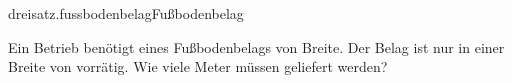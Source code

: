 \begin{exercise}{dreisatz.fussbodenbelag}{Fußbodenbelag}
  \ifproblem\problem\par
    Ein Betrieb benötigt  eines Fußbodenbelags von  Breite.
    Der Belag ist nur in einer Breite von  vorrätig. Wie viele Meter
    müssen geliefert werden?
  \fi
\end{exercise}
